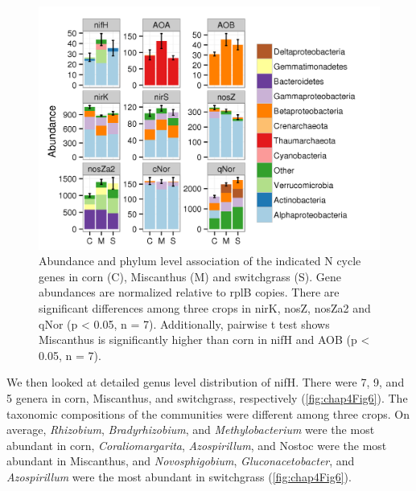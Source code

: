 \documentclass[]{msu-thesis}
\begin{document}
\begin{figure}[tbph!]
  \centering
  \includegraphics[scale=1]{figs/chap4-xander-ncycle-abun}
  \caption[Abundance and phylum association of the indicated N cycle genes]{Abundance and phylum level association of the indicated N cycle genes in corn (C), Miscanthus (M) and switchgrass (S). Gene abundances are normalized relative to rplB copies. There are significant differences among three crops in nirK, nosZ, nosZa2 and qNor (p < 0.05, n = 7). Additionally, pairwise t test shows Miscanthus is significantly higher than corn in nifH and AOB (p < 0.05, n = 7).}
  \label{fig:chap4Fig4}
\end{figure}


We then looked at detailed genus level distribution of nifH. There were 7, 9, and 5 genera in corn, Miscanthus, and switchgrass, respectively (\cref{fig:chap4Fig6}). The taxonomic compositions of the communities were different among three crops. On average, \textit{Rhizobium}, \textit{Bradyrhizobium}, and \textit{Methylobacterium} were the most abundant in corn, \textit{Coraliomargarita}, \textit{Azospirillum}, and Nostoc were the most abundant in Miscanthus, and \textit{Novosphigobium}, \textit{Gluconacetobacter}, and \textit{Azospirillum} were the most abundant in switchgrass (\cref{fig:chap4Fig6}).
\end{document}
